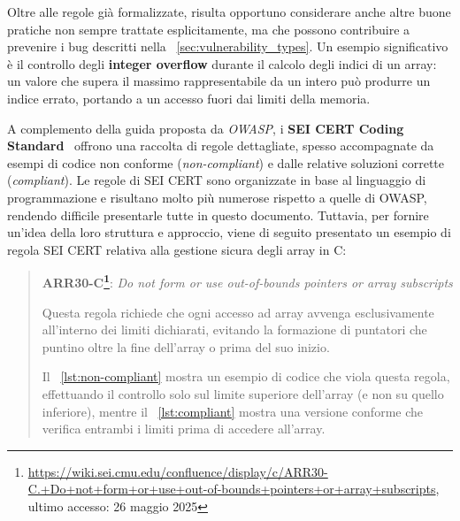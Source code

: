 Oltre alle regole già formalizzate, risulta opportuno considerare anche altre
buone pratiche non sempre trattate esplicitamente, ma che possono contribuire a prevenire
i bug descritti nella ~\autoref{sec:vulnerability_types}. Un esempio significativo
è il controllo degli \textbf{integer overflow} durante il calcolo degli indici
di un array: un valore che supera il massimo rappresentabile da un intero può produrre
un indice errato, portando a un accesso fuori dai limiti della memoria.

A complemento della guida proposta da \textit{OWASP}, i \textbf{SEI CERT Coding
Standard}~\cite{cert_coding_standard} offrono una raccolta di regole dettagliate,
spesso accompagnate da esempi di codice non conforme (\textit{non-compliant}) e dalle
relative soluzioni corrette (\textit{compliant}). Le regole di SEI CERT sono organizzate
in base al linguaggio di programmazione e risultano molto più numerose rispetto a
quelle di OWASP, rendendo difficile presentarle tutte in questo documento. Tuttavia,
per fornire un'idea della loro struttura e approccio, viene di seguito presentato
un esempio di regola SEI CERT relativa alla gestione sicura degli array in C:

\begin{quote}
  \textbf{ARR30-C\protect\footnote{\url{https://wiki.sei.cmu.edu/confluence/display/c/ARR30-C.+Do+not+form+or+use+out-of-bounds+pointers+or+array+subscripts},
  ultimo accesso: 26 maggio 2025}}: \textit{Do not form or use out-of-bounds
  pointers or array subscripts}

  Questa regola richiede che ogni accesso ad array avvenga esclusivamente all'interno
  dei limiti dichiarati, evitando la formazione di puntatori che puntino oltre
  la fine dell'array o prima del suo inizio.

  \bigskip
  \noindent
  Il ~\autoref{lst:non-compliant} mostra un esempio di codice che viola questa regola,
  effettuando il controllo solo sul limite superiore dell'array (e non su quello
  inferiore), mentre il ~\autoref{lst:compliant} mostra una versione conforme
  che verifica entrambi i limiti prima di accedere all'array.
\end{quote}

